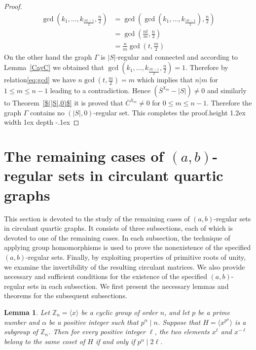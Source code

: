 \documentclass[12pt]{article}
\def\bull{\vrule height 1.2ex width 1ex depth -.1ex }
\newtheorem{lem}[formula]{Lemma}
\begin{document}
\begin{proof}
\begin{equation}
     	\begin{aligned}
     	\gcd\!\left(k_1,\ldots,k_{\frac{|S|-1}{2}},\frac{n}{2}\right)
     	&=\gcd\!\left(\gcd\!\left(k_1,\ldots,k_{\frac{|S|-1}{2}}\right),\frac{n}{2}\right)
     	\\
     	&=\gcd\!\left(\frac{nt}{m},\frac{n}{2}\right)
     	\\
     	&=\frac{n}{m}\gcd\!\left(t,\frac{m}{2}\right)
    	\end{aligned}
    \end{equation}
    On the other hand the graph $\Gamma$ is $|S|$-regular and connected and according to Lemma~\ref{CayC} we obtained that $\gcd(k_1,\dots, k_{\frac{|S|-1}{2}}, \frac{n}{2}) = 1$. Therefore by relation\eqref{eq:gcd} we have $n \gcd(t,\frac{m}{2}) = m$ which implies that $n|m$ for $1 \le m \le n-1$ leading to a contradiction. Hence $(\overline{S}^{\chi_m}-|S|) \neq 0$ and similarly to Theorem~\ref{$(|S|,0)$} it is proved that $\overline{C}^{\chi_m} \neq 0$ for $0 \le m \le n-1$. Therefore the graph $\Gamma$ contains no $(|S|,0)$-regular set. This completes the proof.\hfill\bull  	
    	\end{proof}
   \section{The remaining cases of $(a,b)$-regular sets in circulant quartic graphs}

  \quad This section is devoted to the study of the remaining cases of $(a,b)$-regular sets in circulant quartic graphs. It consists of three subsections, each of which is devoted to one of the remaining cases. In each subsection, the technique of applying group homomorphisms is used to prove the nonexistence of the specified $(a,b)$-regular sets. Finally, by exploiting properties of primitive roots of unity, we examine the invertibility of the resulting circulant matrices. We also provide necessary and sufficient conditions for the existence of the specified $(a,b)$-regular sets in each subsection. We first present the necessary lemmas and theorems for the subsequent subsections.

  \begin{lem}\label{samecoset}
  	Let $\mathbb{Z}_n=\langle x\rangle$ be a cyclic group of order $n$, and let $p$ be a prime number and $\alpha$ be a positive integer such that $p^{\alpha}\mid n$. Suppose that $H=\langle x^{p^{\alpha}}\rangle$ is a subgroup of $\mathbb{Z}_n$. Then for every positive integer $\ell$, the two elements $x^{\ell}$ and $x^{-\ell}$ belong to the same coset of $H$ if and only if $p^{\alpha}\mid2\ell$.
  \end{lem}
\end{document}

